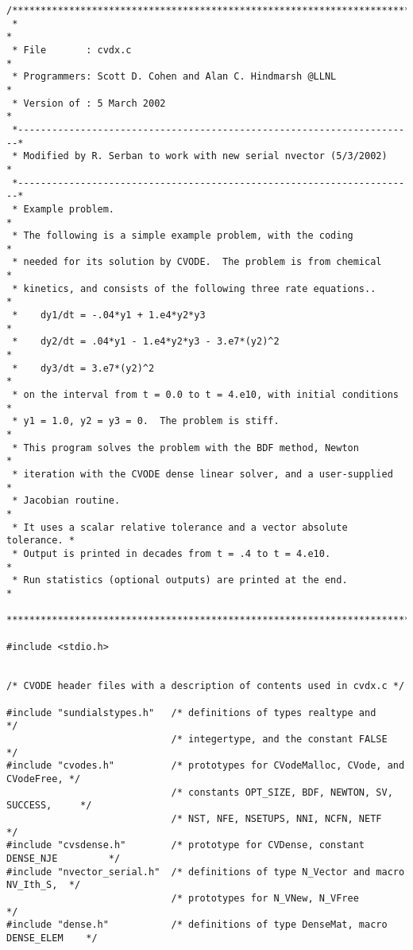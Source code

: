 \begin{verbatim}
/************************************************************************
 *                                                                      *
 * File       : cvdx.c                                                  *
 * Programmers: Scott D. Cohen and Alan C. Hindmarsh @LLNL              *
 * Version of : 5 March 2002                                            *
 *----------------------------------------------------------------------*
 * Modified by R. Serban to work with new serial nvector (5/3/2002)     *
 *----------------------------------------------------------------------*
 * Example problem.                                                     *
 * The following is a simple example problem, with the coding           *
 * needed for its solution by CVODE.  The problem is from chemical      *
 * kinetics, and consists of the following three rate equations..       *
 *    dy1/dt = -.04*y1 + 1.e4*y2*y3                                     *
 *    dy2/dt = .04*y1 - 1.e4*y2*y3 - 3.e7*(y2)^2                        *
 *    dy3/dt = 3.e7*(y2)^2                                              *
 * on the interval from t = 0.0 to t = 4.e10, with initial conditions   *
 * y1 = 1.0, y2 = y3 = 0.  The problem is stiff.                        *
 * This program solves the problem with the BDF method, Newton          *
 * iteration with the CVODE dense linear solver, and a user-supplied    *
 * Jacobian routine.                                                    * 
 * It uses a scalar relative tolerance and a vector absolute tolerance. *
 * Output is printed in decades from t = .4 to t = 4.e10.               *
 * Run statistics (optional outputs) are printed at the end.            *
 ************************************************************************/

#include <stdio.h>


/* CVODE header files with a description of contents used in cvdx.c */

#include "sundialstypes.h"   /* definitions of types realtype and                 */
                             /* integertype, and the constant FALSE               */
#include "cvodes.h"          /* prototypes for CVodeMalloc, CVode, and CVodeFree, */
                             /* constants OPT_SIZE, BDF, NEWTON, SV, SUCCESS,     */
                             /* NST, NFE, NSETUPS, NNI, NCFN, NETF                */
#include "cvsdense.h"        /* prototype for CVDense, constant DENSE_NJE         */
#include "nvector_serial.h"  /* definitions of type N_Vector and macro NV_Ith_S,  */
                             /* prototypes for N_VNew, N_VFree                    */
#include "dense.h"           /* definitions of type DenseMat, macro DENSE_ELEM    */



\end{verbatim}
